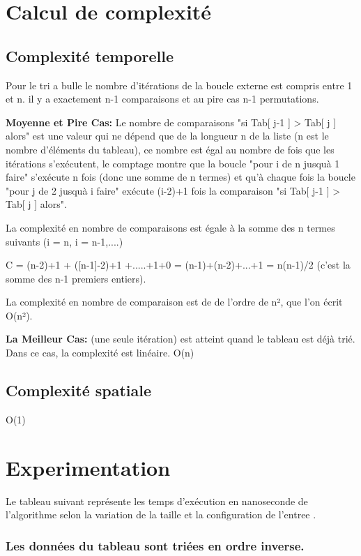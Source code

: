 \section{Calcul de complexité}
\subsection{Complexité temporelle}
Pour le tri a bulle le nombre d'itérations de la boucle externe est compris entre 1 et n. il y a exactement n-1 comparaisons et au pire cas n-1 permutations.

\textbf{Moyenne et Pire Cas:} Le nombre de comparaisons "si Tab[ j-1 ] > Tab[ j ] alors" est une valeur qui ne dépend que de la longueur n de la liste (n est le  nombre d'éléments du tableau), ce nombre est égal au nombre de fois que les itérations s'exécutent, le comptage montre que la boucle "pour i de n jusquà 1 faire" s'exécute n fois (donc une somme de n termes) et qu'à chaque fois la boucle "pour j de 2 jusquà i faire" exécute (i-2)+1 fois la comparaison "si Tab[ j-1 ] > Tab[ j ] alors".

La complexité en nombre de comparaisons est égale à la somme des n termes suivants (i = n, i = n-1,....)

C = (n-2)+1 + ([n-1]-2)+1 +.....+1+0 = (n-1)+(n-2)+...+1 = n(n-1)/2 (c'est la somme des n-1 premiers entiers).

La complexité en nombre de comparaison est de de l'ordre de n², que l'on écrit O(n²).
\par
\textbf{La Meilleur Cas:} (une seule itération) est atteint quand le tableau est déjà trié. Dans ce cas, la complexité est linéaire. O(n)
\subsection{Complexité spatiale}
O(1)
\section{Experimentation}
Le tableau suivant représente les temps d’exécution en nanoseconde de l’algorithme selon la variation de la taille et la configuration de l'entree .
\subsubsection{Les données du tableau sont triées en ordre inverse.}
\small
\begin{center}
\end{center}
\normalsize
